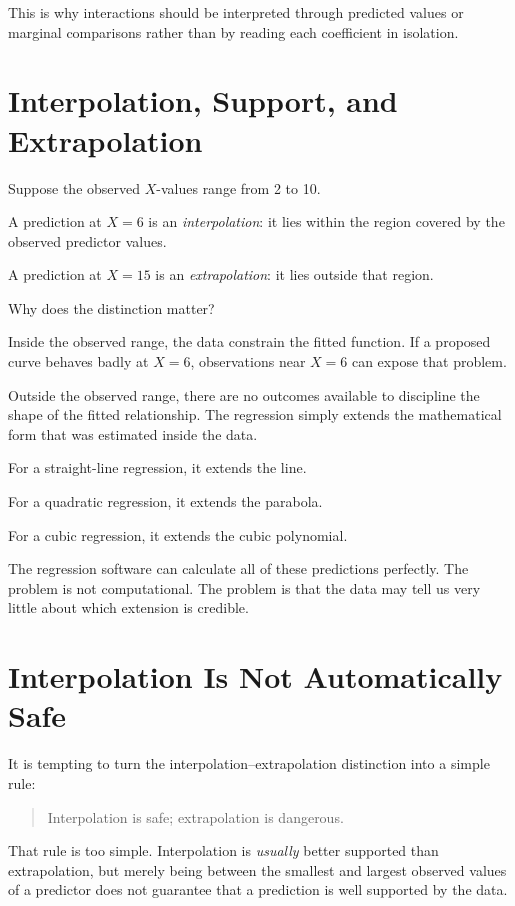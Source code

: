 \documentclass[11pt]{report}
\begin{document}
This is why interactions should be interpreted through predicted values or marginal comparisons rather than by reading each coefficient in isolation.

\section{Interpolation, Support, and Extrapolation}

Suppose the observed \(X\)-values range from 2 to 10.

A prediction at \(X=6\) is an \emph{interpolation}: it lies within the region covered by the observed predictor values.

A prediction at \(X=15\) is an \emph{extrapolation}: it lies outside that region.

Why does the distinction matter?

Inside the observed range, the data constrain the fitted function. If a proposed curve behaves badly at \(X=6\), observations near \(X=6\) can expose that problem.

Outside the observed range, there are no outcomes available to discipline the shape of the fitted relationship. The regression simply extends the mathematical form that was estimated inside the data.

For a straight-line regression, it extends the line.

For a quadratic regression, it extends the parabola.

For a cubic regression, it extends the cubic polynomial.

The regression software can calculate all of these predictions perfectly. The problem is not computational. The problem is that the data may tell us very little about which extension is credible.

\section{Interpolation Is Not Automatically Safe}

It is tempting to turn the interpolation--extrapolation distinction into a simple rule:

\begin{quote}
Interpolation is safe; extrapolation is dangerous.
\end{quote}

That rule is too simple. Interpolation is \emph{usually} better supported than extrapolation, but merely being between the smallest and largest observed values of a predictor does not guarantee that a prediction is well supported by the data.
\end{document}
